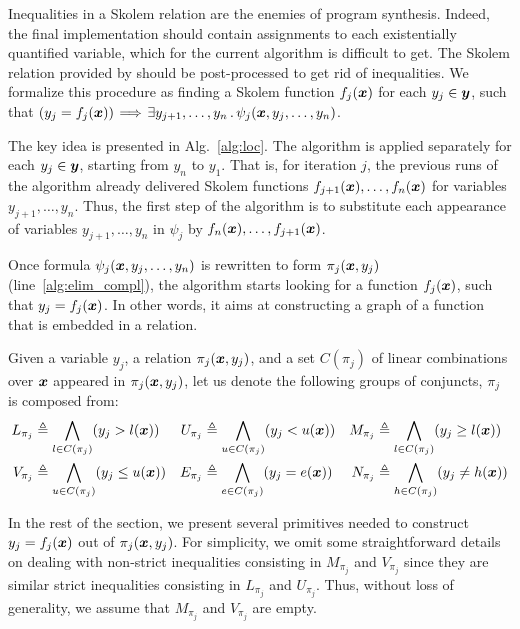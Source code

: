 Inequalities in a Skolem relation are the enemies of program synthesis.
Indeed, the final implementation should contain assignments to each
existentially quantified variable, which for the current algorithm is difficult to
get.
The Skolem relation provided by \aeval should be post-processed to get rid of inequalities.
We formalize this procedure as finding a Skolem function $f_j(\vx)$ for each $y_j\in \vy$, such that $(y_j = f_j(\vx)) \!\implies\! \exists y_{j+1},\ldots,y_{n} \such \psi_j(\vx,y_{j},\ldots,y_{n})$.

The key idea is presented in Alg.~\ref{alg:loc}.
The algorithm is applied separately for each $y_j \in \vy$, starting from $y_n$ to $y_1$.
That is, for iteration $j$, the previous runs of the algorithm  already delivered Skolem functions $f_{j+1}(\vx),\ldots,f_{n}(\vx)$ for variables $y_{j+1},\ldots,y_n$.
Thus, the first step of the algorithm is to substitute each appearance of variables $y_{j+1},\ldots, y_{n}$ in $\psi_j$ by $f_{n}(\vx),\ldots,f_{j+1}(\vx)$.

Once formula $\psi_j(\vx,y_{j},\ldots,y_{n})$ is rewritten to form $\pi_j(\vx,y_{j})$ (line~\ref{alg:elim_compl}), the algorithm starts looking for a function $f_j(\vx)$, such that $y_j = f_j(\vx)$.
In other words, it aims at constructing a graph of a function that is embedded in a relation.

\begin{definition}
Given a variable $y_j$, a relation $\pi_j(\vx,y_{j})$, and a set $C({\pi_j})$ of linear combinations over $\vx$ appeared in $\pi_j(\vx,y_{j})$, let us denote the following groups of conjuncts, $\pi_j$ is composed from:
\begin{align*}
L_{\pi_j} &\triangleq \Land_{l \in C({\pi_j})}(y_j > l(\vx)) &
U_{\pi_j} &\triangleq \Land_{u \in C({\pi_j})}(y_j < u(\vx)) &  
M_{\pi_j} &\triangleq \Land_{l \in C({\pi_j})}(y_j \ge l(\vx)) \\
V_{\pi_j} &\triangleq \Land_{u \in C({\pi_j})}(y_j \le u(\vx))  &
E_{\pi_j} &\triangleq \Land_{e \in C({\pi_j})}(y_j = e(\vx))  &
N_{\pi_j} &\triangleq \Land_{h \in C({\pi_j})}(y_j \neq h(\vx))  
\end{align*}
\end{definition}

In the rest of the section, we present several primitives needed to construct $y_j = f_j(\vx)$ out of $\pi_j(\vx,y_{j})$.
For simplicity, we omit some straightforward details on dealing with
non-strict inequalities consisting in $M_{\pi_j}$ and $V_{\pi_j}$ since
they are similar strict inequalities consisting in $L_{\pi_j}$ and $U_{\pi_j}$.
Thus,  without loss of generality, we assume that $M_{\pi_j}$ and $V_{\pi_j}$ are empty.


